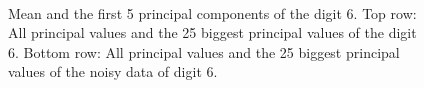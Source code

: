 \documentclass[a4paper, 12pt, titlepage]{article}
\begin{document}
\begin{figure}[H]
	\centering
	\\
	\caption{\protect{} Mean and the first 5 principal components of the digit 6. \protect{} Top row: All principal values and the 25 biggest principal values of the digit 6. Bottom row: All principal values and the 25 biggest principal values of the noisy data of digit 6.}
\end{figure}
\end{document}
